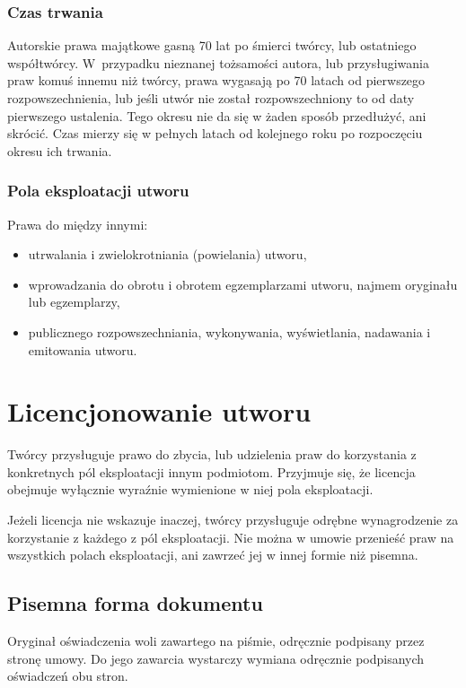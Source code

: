 \documentclass{article}
\begin{document}
\subsubsection{Czas trwania}

Autorskie prawa majątkowe gasną 70 lat po śmierci twórcy, lub ostatniego współtwórcy.
W~przypadku nieznanej tożsamości autora, lub przysługiwania praw komuś innemu niż twórcy, prawa wygasają po 70 latach od pierwszego rozpowszechnienia, lub jeśli utwór nie został rozpowszechniony to od daty pierwszego ustalenia. Tego okresu nie da się w żaden sposób przedłużyć, ani skrócić. Czas mierzy się w pełnych latach od kolejnego roku po rozpoczęciu okresu ich trwania.

\subsubsection{Pola eksploatacji utworu}

Prawa do między innymi:
\begin{itemize}
  \item utrwalania i zwielokrotniania (powielania) utworu,
  \item wprowadzania do obrotu i obrotem egzemplarzami utworu, najmem oryginału lub egzemplarzy,
  \item publicznego rozpowszechniania, wykonywania, wyświetlania, nadawania i emitowania utworu.
\end{itemize}

\section{Licencjonowanie utworu}

Twórcy przysługuje prawo do zbycia, lub udzielenia praw do korzystania z konkretnych pól eksploatacji innym podmiotom.
Przyjmuje się, że licencja obejmuje wyłącznie wyraźnie wymienione w niej pola eksploatacji.

Jeżeli licencja nie wskazuje inaczej, twórcy przysługuje odrębne wynagrodzenie za korzystanie z każdego z pól eksploatacji. Nie można w umowie przenieść praw na wszystkich polach eksploatacji, ani zawrzeć jej w innej formie niż pisemna.

\subsection{Pisemna forma dokumentu}

Oryginał oświadczenia woli zawartego na piśmie, odręcznie podpisany przez stronę umowy. Do jego zawarcia wystarczy wymiana odręcznie podpisanych oświadczeń obu stron.
\end{document}
